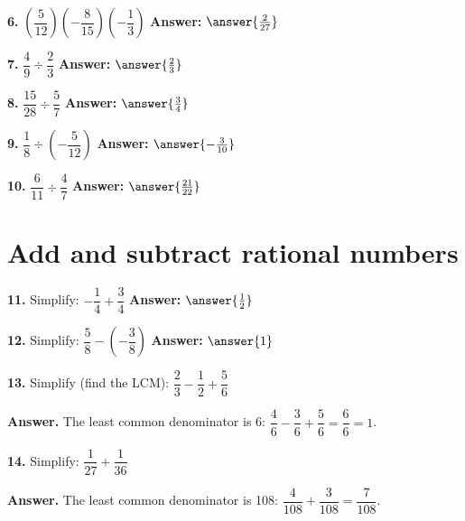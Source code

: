 \documentclass{ximera}
\begin{document}
\begin{problem}
\textbf{6.} $\left(\dfrac{5}{12}\right)\left(-\dfrac{8}{15}\right)\left(-\dfrac{1}{3}\right)$
\qquad \textbf{Answer:} $\answer{\frac{2}{27}}$
\end{problem}

\begin{problem}
\textbf{7.} $\dfrac{4}{9} \div \dfrac{2}{3}$ \qquad \textbf{Answer:} $\answer{\frac{2}{3}}$
\end{problem}

\begin{problem}
\textbf{8.} $\dfrac{15}{28} \div \dfrac{5}{7}$ \qquad \textbf{Answer:} $\answer{\frac{3}{4}}$
\end{problem}

\begin{problem}
\textbf{9.} $\dfrac{1}{8} \div \left(-\dfrac{5}{12}\right)$ \qquad
\textbf{Answer:} $\answer{-\frac{3}{10}}$
\end{problem}

\begin{problem}
\textbf{10.} $\dfrac{6}{11} \div \dfrac{4}{7}$ \qquad \textbf{Answer:} $\answer{\frac{21}{22}}$
\end{problem}

\section*{Add and subtract rational numbers}

\begin{problem}
\textbf{11.} Simplify: $-\dfrac{1}{4}+\dfrac{3}{4}$ \qquad
\textbf{Answer:} $\answer{\frac{1}{2}}$
\end{problem}

\begin{problem}
\textbf{12.} Simplify: $\dfrac{5}{8}-\left(-\dfrac{3}{8}\right)$ \qquad
\textbf{Answer:} $\answer{1}$
\end{problem}

\begin{problem}
\textbf{13.} Simplify (find the LCM): $\dfrac{2}{3}-\dfrac{1}{2}+\dfrac{5}{6}$

\begin{hint}
\textbf{Answer.} The least common denominator is 6:
$\dfrac{4}{6}-\dfrac{3}{6}+\dfrac{5}{6}=\dfrac{6}{6}=1$.
\end{hint}
\end{problem}

\begin{problem}
\textbf{14.} Simplify: $\dfrac{1}{27}+\dfrac{1}{36}$

\begin{hint}
\textbf{Answer.} The least common denominator is 108:
$\dfrac{4}{108}+\dfrac{3}{108}=\dfrac{7}{108}$.
\end{hint}
\end{problem}
\end{document}
